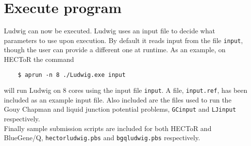 \documentclass[12pt,a4paper]{article}
\begin{document}
\section{Execute program}
  Ludwig can now be executed.
  Ludwig uses an input file to decide what parameters to use upon execution.
  By default it reads input from the file \texttt{input}, though the user can provide a different one at runtime.
  As an example, on HECToR the command
  \begin{verbatim}
    $ aprun -n 8 ./Ludwig.exe input
  \end{verbatim}
  will run Ludwig on 8 cores using the input file \texttt{input}.
  A file, \texttt{input.ref}, has been included as an example input file.
  Also included are the files used to run the Gouy Chapman and liquid junction potential problems, \texttt{GCinput} and \texttt{LJinput} respectively.\\
  Finally sample submission scripts are included for both HECToR and BlueGene/Q, \texttt{hectorludwig.pbs} and \texttt{bgqludwig.pbs} respectively. 
\end{document}
